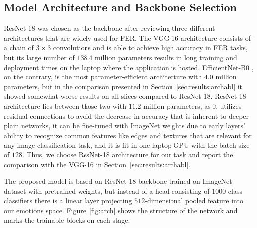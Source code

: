 \documentclass[12pt,a4paper]{article}
\begin{document}
\subsection{Model Architecture and Backbone Selection}
\label{sec:impl:arch}

ResNet-18 was chosen as the backbone after reviewing three
different architectures that are widely used for FER. The VGG-16
architecture \autocite{simonyan2015vgg} consists of a chain of
$3 \times 3$ convolutions and is able to achieve high accuracy
in FER tasks, but its large number of $138.4$ million parameters
results in long training and deployment times on the laptop
where the application is hosted. EfficientNet-B0
\autocite{tan2019efficientnet}, on the contrary, is the most
parameter-efficient architecture with $4.0$ million parameters,
but in the comparison presented in
Section~\ref{sec:results:archabl} it showed somewhat worse
results on all slices compared to ResNet-18. ResNet-18
architecture lies between those two with $11.2$ million
parameters, as it utilizes residual connections
\autocite{he2016resnet} to avoid the decrease in accuracy that
is inherent to deeper plain networks, it can be fine-tuned with
ImageNet weights due to early layers' ability to recognize
common features like edges and textures that are relevant for
any image classification task, and it is fit in one laptop GPU
with the batch size of $128$. Thus, we choose ResNet-18
architecture for our task and report the comparison with the
VGG-16 in Section~\ref{sec:results:archabl}.

The proposed model is based on ResNet-18 backbone trained on
ImageNet dataset with pretrained weights, but instead of a head
consisting of $1000$ class classifiers there is a linear layer
projecting $512$-dimensional pooled feature into our emotions
space. Figure~\ref{fig:arch} shows the structure of the network
and marks the trainable blocks on each stage.
\end{document}
